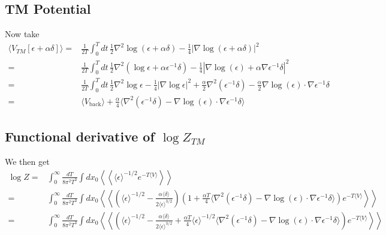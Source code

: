 \subsection{TM Potential}
Now take 
\begin{align}
\langle V_{TM}[\epsilon +\alpha\delta] \rangle =& 
\frac{1}{2T}\int_0^Tdt\,\frac{1}{2}\nabla^2\log(\epsilon+\alpha\delta)-\frac{1}{4}|\nabla\log(\epsilon+\alpha\delta)|^2\\
=& \frac{1}{2T}\int_0^Tdt\,\frac{1}{2}\nabla^2\left( \log\epsilon + \alpha\epsilon^{-1}\delta\right)
-\frac{1}{4}|\nabla\log(\epsilon) +\alpha\nabla\epsilon^{-1}\delta|^2\\
=& \frac{1}{2T}\int_0^Tdt\,\frac{1}{2}\nabla^2\log\epsilon - \frac{1}{4}|\nabla\log\epsilon|^2 
+ \frac{\alpha}{2}\nabla^2(\epsilon^{-1}\delta)-\frac{\alpha}{2}\nabla\log(\epsilon)\cdot\nabla\epsilon^{-1}\delta\\
=& \langle V_{\text{back}}\rangle + \frac{\alpha}{4}\langle \nabla^2(\epsilon^{-1}\delta)
- \nabla\log(\epsilon)\cdot\nabla\epsilon^{-1}\delta\rangle
\end{align}
\subsection{Functional derivative of $\log Z_{TM}$}
We then get
\begin{align}
\log Z =&\int_0^\infty \frac{dT}{8\pi^2T^3}\int dx_0\left<\left< \langle\epsilon\rangle^{-1/2}e^{- T\langle V\rangle}\right>\right>\\
=& \int_0^\infty \frac{dT}{8\pi^2T^3}\int dx_0\left<\left< \left(\langle\epsilon\rangle^{-1/2}
-\frac{\alpha\langle\delta\rangle}{2\langle\epsilon\rangle^{3/2}}\right)
\left( 1 + \frac{\alpha T}{4}\langle\nabla^2(\epsilon^{-1}\delta)
-\nabla\log(\epsilon)\cdot\nabla\epsilon^{-1}\delta\rangle\right)e^{-T\langle V\rangle}\right>\right>\\
=& \int_0^\infty \frac{dT}{8\pi^2T^3}\int dx_0\left<\left< 
\left(\langle\epsilon\rangle^{-1/2}-\frac{\alpha\langle\delta\rangle}{2\langle\epsilon\rangle^{3/2}}  
+ \frac{\alpha T}{4}\langle\epsilon\rangle^{-1/2}\langle \nabla^2(\epsilon^{-1}\delta)-
\nabla\log(\epsilon)\cdot\nabla\epsilon^{-1}\delta\rangle\right)e^{-T\langle V\rangle}\right>\right>
\end{align}

